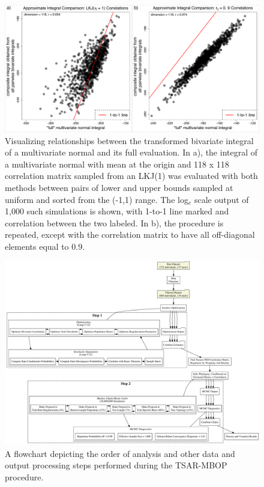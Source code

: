 \begin{figure}[h]
\centering
\includegraphics[width=160mm]{figures/chpt4_figure2.pdf}
\caption[Approximation of Multivariate Normal Integral by Bivariate Normal Integrals]{Visualizing relationships between the transformed bivariate integral of a multivariate normal and its full evaluation. In a), the integral of a multivariate normal with mean at the origin and 118 x 118 correlation matrix sampled from an LKJ(1) was evaluated with both methods between pairs of lower and upper bounds sampled at uniform and sorted from the (-1,1) range. The log$_e$ scale output of 1,000 such simulations is shown, with 1-to-1 line marked and correlation between the two labeled. In b), the procedure is repeated, except with the correlation matrix to have all off-diagonal elements equal to 0.9.  
\label{fig:bivVSmultivDENTAL}
\label{overflow}}
\end{figure}

\begin{figure}[h]
\centering
\includegraphics[width=160mm]{figures/tsarmbop.pdf}
\caption[TSAR-MBOP Flowchart]{A flowchart depicting the order of analysis and other data and output processing steps performed during the TSAR-MBOP procedure. \label{overflow}
\label{fig:tsarMBOP}
}
\end{figure}

